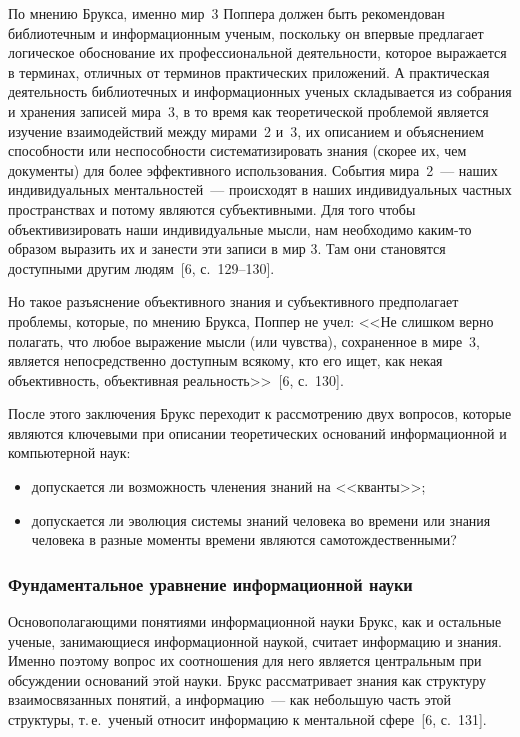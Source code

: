 \begin{multicols}{2}
      По мнению Брукса, именно мир~3 Поппера должен быть рекомендован библиотечным и
ин\-формационным ученым, поскольку он впервые предлагает логическое обоснование их
профессиональной деятельности, которое выражается в терминах, отличных от терминов
практических приложений. А практическая деятельность библиотечных и информационных
ученых складывается из собрания и хранения записей мира~3, в то время как теоретической
проблемой является изучение взаимодействий между мирами~2 и~3, их описанием и
объяснением способности или неспособности сис\-те\-ма\-ти\-зи\-ро\-вать знания (скорее их, чем
документы) для более эффективного использования. События мира~2~--- наших
индивидуальных ментальностей~--- происходят в наших индивидуальных частных
пространствах и потому являются субъективными. Для того чтобы объективизировать наши
индивидуальные мысли, нам необходимо каким-то образом выразить их и занести эти записи в
мир 3. Там они становятся доступными другим людям~[6, с.~129--130].

      Но такое разъяснение объективного знания и субъективного предполагает проблемы,
которые, по мнению Брукса, Поппер не учел: <<Не слишком верно полагать, что любое
выражение мысли (или чувства), сохраненное в мире~3, является непосредственно доступным
всякому, кто его ищет, как некая объективность, объективная 
реальность>>~[6, с.~130].

      После этого заключения Брукс переходит к рассмотрению двух вопросов, которые
являются ключевыми при описании теоретических оснований информационной и
компьютерной наук:
      \begin{itemize}
\item допускается ли возможность членения знаний на <<кванты>>;
\item допускается ли эволюция системы знаний человека во времени или знания человека
в разные моменты времени являются самотождественными?
\end{itemize}

\subsubsection{Фундаментальное уравнение информационной науки} %

      Основополагающими понятиями информационной науки Брукс, как и остальные ученые,
занимающиеся информационной наукой, считает информацию и знания. Именно поэтому
вопрос их соотношения для него является центральным при обсуждении оснований этой науки.
Брукс рас\-смат\-ри\-ва\-ет знания как структуру взаимосвязанных понятий, а информацию~--- как
небольшую часть этой структуры, т.\,е.\ ученый относит информацию к ментальной
сфере~[6, с.~131].


\end{multicols}
